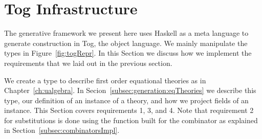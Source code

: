 
\begin{comment}
\begin{figure}
\centering{
\texttt{[image: figures/genetaor\_hierarch.png]}}
\caption{Three layered hierarchy of the generator.}
\label{fig:generator_hierarch}
\end{figure}
\end{comment}

\section{Tog Infrastructure}
\label{sec:togFamework}

The generative framework we present here uses Haskell as a meta language to generate construction in Tog, the object language.  
We mainly manipulate the types in Figure~\ref{fig:togRepr}. In this Section we discuss how we implement the requirements that we laid out in the previous section. 
 

We create a type  to describe first order equational theories as in Chapter~\ref{ch:ualgebra}. In Secion~\ref{subsec:generation:eqTheories} we describe this type, our definition of an instance of a theory, and how we project fields of an instance. This Section covers requirements 1, 3, and 4. Note that requirement 2 for substitutions is done using the  function built for the  combinator as explained in Section~\ref{subsec:combinatorsImpl}. 

